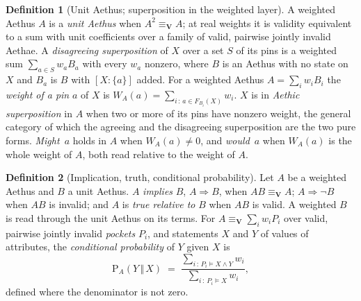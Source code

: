 \documentclass[11pt]{article}
\theoremstyle{definition}
\newtheorem{definition}{Definition}
\newcommand{\Aethus}{Aethus}
\begin{document}
\begin{definition}[Unit \Aethus{}; superposition in the weighted layer]\label{def:core_unit}
A weighted \Aethus{} $A$ is a \emph{unit \Aethus{}} when $A^{2} \equiv_{\mathbf{V}} A$; at real weights it is validity equivalent to a sum with unit coefficients over a family of valid, pairwise jointly invalid Aethae. A \emph{disagreeing superposition} of $X$ over a set $S$ of its pins is a weighted sum $\sum_{a \in S} w_a B_a$ with every $w_a$ nonzero, where $B$ is an \Aethus{} with no state on $X$ and $B_a$ is $B$ with $[X : \{a\}]$ added. For a weighted \Aethus{} $A = \sum_i w_i B_i$ the \emph{weight of a pin} $a$ of $X$ is $W_A(a) = \sum_{i \,:\, a \in F_{B_i}(X)} w_i$. $X$ is in \emph{Aethic superposition} in $A$ when two or more of its pins have nonzero weight, the general category of which the agreeing and the disagreeing superposition are the two pure forms. \emph{Might}~$a$ holds in $A$ when $W_A(a) \neq 0$, and \emph{would}~$a$ when $W_A(a)$ is the whole weight of $A$, both read relative to the weight of $A$.
\end{definition}

\begin{definition}[Implication, truth, conditional probability]\label{def:core_implication}
Let $A$ be a weighted \Aethus{} and $B$ a unit \Aethus{}. $A$ \emph{implies} $B$, $A \Rightarrow B$, when $AB \equiv_{\mathbf{V}} A$; $A \Rightarrow \lnot B$ when $AB$ is invalid; and $A$ is \emph{true relative to} $B$ when $AB$ is valid. A weighted $B$ is read through the unit \Aethus{} on its terms. For $A \equiv_{\mathbf{V}} \sum_i w_i P_i$ over valid, pairwise jointly invalid \emph{pockets} $P_i$, and statements $X$ and $Y$ of values of attributes, the \emph{conditional probability} of $Y$ given $X$ is
\[
\mathrm{P}_A(Y \,\Vert\, X) \;=\; \frac{\sum_{i \,:\, P_i \models X \wedge Y} w_i}{\sum_{i \,:\, P_i \models X} w_i} ,
\]
defined where the denominator is not zero.
\end{definition}
\end{document}
